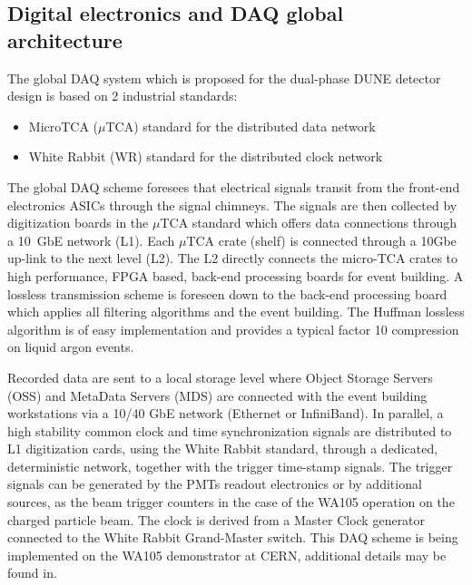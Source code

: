 \subsection{Digital electronics and DAQ global architecture}

The global DAQ system which is proposed for the dual-phase DUNE
detector design is based on 2 industrial standards:
\begin{itemize}
\item MicroTCA ($\mu$TCA) standard for the distributed data network \cite{mTCA-standard}
\item White Rabbit (WR) standard for the distributed clock network \cite{WR-standard}
\end{itemize}

The global DAQ scheme foresees that electrical signals transit from
the front-end electronics ASICs through the signal chimneys. The
signals are then collected by digitization boards in the $\mu$TCA
standard which offers data connections through a 10~GbE network
(L1). Each $\mu$TCA crate (shelf) is connected through a 10Gbe up-link
to the next level (L2). The L2 directly connects the micro-TCA crates
to high performance, FPGA based, back-end processing boards for event
building. A lossless transmission scheme is foreseen down to the
back-end processing board which applies all filtering algorithms and
the event building. The Huffman lossless algorithm is of easy
implementation and provides a typical factor 10 compression on liquid
argon events.

Recorded data are sent to a local storage level where Object Storage
Servers (OSS) and MetaData Servers (MDS) are connected with the event
building workstations via a 10/40 GbE network (Ethernet or
InfiniBand). In parallel, a high stability common clock and time
synchronization signals are distributed to L1 digitization cards,
using the White Rabbit standard, through a dedicated, deterministic
network, together with the trigger time-stamp signals. The trigger
signals can be generated by the PMTs readout electronics or by
additional sources, as the beam trigger counters in the case of the
WA105 operation on the charged particle beam. The clock is derived
from a Master Clock generator connected to the White Rabbit
Grand-Master switch. This DAQ scheme is being implemented on the WA105
demonstrator at CERN, additional details may be found in\cite{WA105_TDR}.

